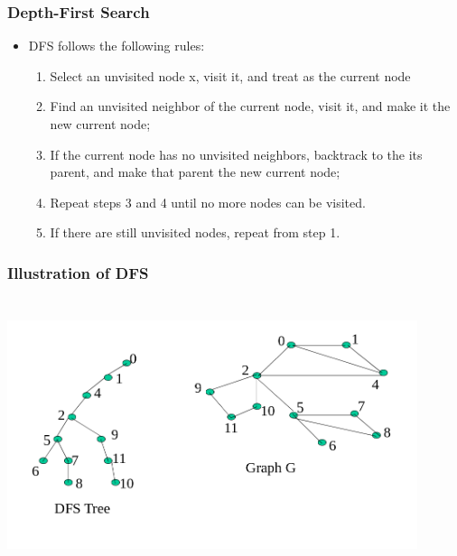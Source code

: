 \documentclass{beamer}
\begin{document}
\begin{frame}
\frametitle{Depth-First Search }
\begin{itemize}
\item DFS follows the following rules: 
\begin{enumerate}
\item Select an unvisited node x, visit it, and treat as the current node 
\item Find an unvisited neighbor of the current node, visit it, and make it the new current node; 
\item If the current node has no unvisited neighbors, backtrack to the its parent, and make that parent the new current node; 
\item Repeat steps 3 and 4 until no more nodes can be visited. 
\item If there are still unvisited nodes, repeat from step 1.
\end{enumerate}
\end{itemize}
\end{frame}


\begin{frame}
\frametitle{Illustration of DFS}
\includegraphics[height = 8cm,width = 12cm]{dfs}

\end{frame}
\end{document}
